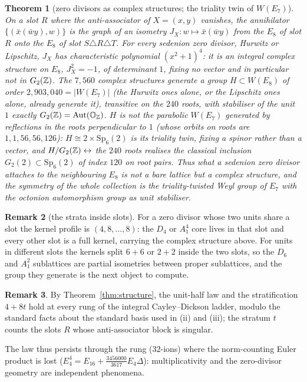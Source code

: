 \documentclass[11pt]{amsart}
\newtheorem{theorem}{Theorem}[section]
\theoremstyle{definition}
\newtheorem{remark}[theorem]{Remark}
\begin{document}
\begin{theorem}[zero divisors as complex structures; the triality twin of $W(E_7)$]\label{thm:complex}
On a slot $R$ where the anti-associator of $X=(x,y)$ vanishes, the annihilator $\{(\bar x(\bar wy),w)\}$ is the graph of an isometry $J_X\colon w\mapsto\bar x(\bar wy)$ from the $E_8$ of slot $R$ onto the $E_8$ of slot $S\triangle R\triangle T$. For every sedenion zero divisor, Hurwitz or Lipschitz, $J_X$ has characteristic polynomial $(x^2+1)^4$: it is an integral complex structure on $E_8$, $J_X^2=-1$, of determinant $1$, fixing no vector and in particular not in $G_2(\mathbb{Z})$. The $7{,}560$ complex structures generate a group $H\subset W(E_8)$ of order $2{,}903{,}040=|W(E_7)|$ (the Hurwitz ones alone, or the Lipschitz ones alone, already generate it), transitive on the $240$ roots, with stabiliser of the unit $1$ exactly $G_2(\mathbb{Z})=\operatorname{Aut}(\mathbb O_{\mathbb{Z}})$. $H$ is not the parabolic $W(E_7)$ generated by reflections in the roots perpendicular to $1$ (whose orbits on roots are $1,1,56,56,126$): $H\cong2\times\mathrm{Sp}_6(2)$ is its triality twin, fixing a spinor rather than a vector, and $H/G_2(\mathbb{Z})\leftrightarrow$ the $240$ roots realises the classical inclusion $G_2(2)\subset\mathrm{Sp}_6(2)$ of index $120$ on root pairs. Thus what a sedenion zero divisor attaches to the neighbouring $E_8$ is not a bare lattice but a complex structure, and the symmetry of the whole collection is the triality-twisted Weyl group of $E_7$ with the octonion automorphism group as unit stabiliser.
\end{theorem}
\begin{remark}[the strata inside slots]
For a zero divisor whose two units share a slot the kernel profile is $(4,8,\dots,8)$: the $D_4$ or $A_1^4$ core lives in that slot and every other slot is a full kernel, carrying the complex structure above. For units in different slots the kernels split $6+6$ or $2+2$ inside the two slots, so the $D_6$ and $A_1^2$ sublattices are partial isometries between proper sublattices, and the group they generate is the next object to compute.
\end{remark}

\begin{remark}
By Theorem~\ref{thm:structure}, the unit-half law and the stratification $4+8t$ hold at every rung of the integral Cayley--Dickson ladder, modulo the standard facts about the standard basis used in (ii) and (iii); the stratum $t$ counts the slots $R$ whose anti-associator block is singular.
\end{remark}
The law thus persists through the rung ($32$-ions) where the norm-counting Euler product is lost ($E_4^4=E_{16}+\tfrac{3456000}{3617}E_4\Delta$): multiplicativity and the zero-divisor geometry are independent phenomena.
\end{document}
